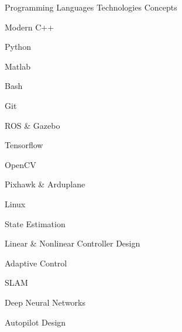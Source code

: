 
\begin{cventries}

  \cventrycol
  {Programming Languages}
  {Technologies}
  {Concepts}
  {
    \begin{cvitems}
      \item {Modern C++}
      \item {Python}
      \item {Matlab}
      \item {Bash}
    \end{cvitems}
  }
  {
    \begin{cvitems}
      \item {Git}
      \item {ROS \& Gazebo}
      \item {Tensorflow}
      \item {OpenCV}
      \item {Pixhawk \& Arduplane}
      \item {Linux}
    \end{cvitems}
  }
  {
    \begin{cvitems}
      \item {State Estimation}
      \item {Linear \& Nonlinear Controller Design}
      \item {Adaptive Control}
      \item {SLAM}
      \item {Deep Neural Networks}
      \item {Autopilot Design}
    \end{cvitems}
  }

\end{cventries}

